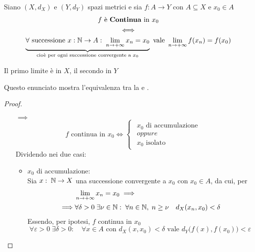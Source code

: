 \begin{proposition}
	\label{prop:cont_e_cont_per_succ}
	Siano $(X,d_X)$ e $(Y,d_Y)$ spazi metrici e sia $f: A \to Y$ con $A \subseteq X$ e $x_0 \in A$
	\begin{equation*}
		\begin{gathered}
			f \text{ è \textbf{Continua} in } x_0\\
			\iff\\
			\underbrace{\forall \text{ successione } x:\mathbb{N} \to A:\; \lim\limits_{n \to +\infty} x_n = x_0}_{\text{cioè per ogni successione convergente a } x_0} \text{ vale } \lim\limits_{n \to +\infty} f(x_n) = f(x_0)
		\end{gathered}
	\end{equation*}
	\begin{note}
		Il primo limite è in $X$, il secondo in $Y$
	\end{note}
	\begin{note}
		Questo enunciato mostra l'equivalenza tra la  e .
	\end{note}
	\begin{proof}~
		\begin{itemize}
			\item[$\implies$]
			\[f \text{ continua in } x_0 \iff
				\begin{cases}
					\begin{array}{c}
						x_0 \text{ di accumulazione}\\
						oppure\\
						x_0 \text{ isolato}
					\end{array}
				\end{cases}\]
				Dividendo nei due casi:
				\begin{itemize}
					\item $x_0$ di accumulazione:\\
						Sia $x:\; \mathbb{N} \to X$ una successione convergente a $x_0$ con $x_0 \in A$, da cui, per 
						\begin{align*}
							& \lim\limits_{n \to +\infty} x_n = x_0 \implies\\
							\implies & \forall \delta > 0\; \exists \nu \in \mathbb{N}:\; \forall n \in \mathbb{N},\; n \geq \nu \quad d_X(x_n, x_0) < \delta
						\end{align*}
						Essendo, per ipotesi, $f$ continua in $x_0$
						\begin{equation*}
							\forall \varepsilon > 0\; \exists \delta > 0:\quad \forall x \in A \text{ con } d_X(x,x_0)<\delta \text{ vale } d_Y \bigl(f(x),f(x_0)\bigr) < \varepsilon

\end{equation*}
\end{itemize}
\end{itemize}
\end{proof}
\end{proposition}

